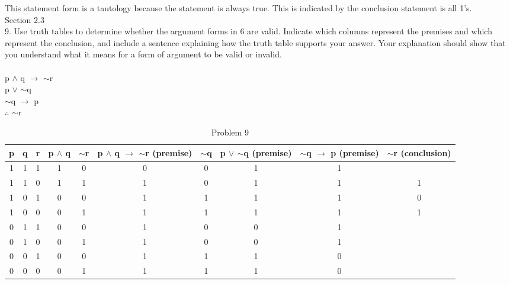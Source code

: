 \documentclass{article}
\begin{document}
This statement form is a tautology because the statement is always true. This is indicated by the conclusion statement is all 1's. \\

Section 2.3\\
9. Use truth tables to determine whether the argument forms in 6 are valid. Indicate which columns represent the premises and
which represent the conclusion, and include a sentence explaining how the truth table supports your answer. Your explanation
should show that you understand what it means for a form of argument to be valid or invalid.\\
\\
p $\wedge$ q $\rightarrow$ $\sim$r \\
p $\vee$ $\sim$q \\
$\sim$q $\rightarrow$ p \\
$\therefore$ $\sim$r \\

\begin{table}[h]
\centering
\caption{Problem 9}
\label{my-label}
\begin{tabular}{|c|c|c|c|c|c|c|c|c|c|}
\hline
p & q & r & p $\wedge$  q & $\sim$r & p $\wedge$  q $\rightarrow$ $\sim$r (premise) & $\sim$q & p $\vee$ $\sim$q (premise) & $\sim$q $\rightarrow$ p (premise) & $\sim$r (conclusion) \\ \hline
1 & 1 & 1 & 1                     & 0       & 0                                          & 0       & 1            & 1                      &         \\ \hline
1 & 1 & 0 & 1                     & 1       & 1                                          & 0       & 1            & 1                      & 1       \\ \hline
1 & 0 & 1 & 0                     & 0       & 1                                          & 1       & 1            & 1                      & 0       \\ \hline
1 & 0 & 0 & 0                     & 1       & 1                                          & 1       & 1            & 1                      & 1       \\ \hline
0 & 1 & 1 & 0                     & 0       & 1                                          & 0       & 0            & 1                      &         \\ \hline
0 & 1 & 0 & 0                     & 1       & 1                                          & 0       & 0            & 1                      &         \\ \hline
0 & 0 & 1 & 0                     & 0       & 1                                          & 1       & 1            & 0                      &         \\ \hline
0 & 0 & 0 & 0                     & 1       & 1                                          & 1       & 1            & 0                      &         \\ \hline
\end{tabular}
\end{table}
\end{document}
